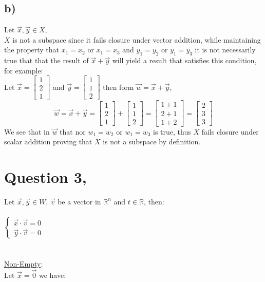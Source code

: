 \documentclass{article}
\begin{document}
\subsection*{b)}
Let $\vec{x},\vec{y}\in X$, \\
$X$ is not a subspace since it fails closure under vector addition, while maintaining the property that $x_1=x_2$ or $x_1=x_3$ and $y_1=y_2$ or $y_1=y_3$ it is not necessarily true that that the result of $\vec{x}+\vec{y}$ will yield a result that satisfies this condition, for example:\\
Let $\vec{x}=\begin{bmatrix}
    1\\2\\1
\end{bmatrix}$ and $\vec{y}=\begin{bmatrix}
    1\\1\\2
\end{bmatrix}$ then form $\vec{w}=\vec{x}+\vec{y}$,$$
\vec{w}=\vec{x}+\vec{y}=\begin{bmatrix}
    1\\2\\1
\end{bmatrix}
+
\begin{bmatrix}
    1\\1\\2
\end{bmatrix}
=
\begin{bmatrix}
    1+1\\
    2+1\\
    1+2
\end{bmatrix}=
\begin{bmatrix}
    2\\3\\3
\end{bmatrix}
$$
We see that in $\vec{w}$ that nor $w_1=w_2$ or $w_1=w_3$ is true, thus $X$ fails closure under scalar addition proving that $X$ is not a subspace by definition.
\newpage
\section*{Question 3, }
Let $\vec{x},\vec{y}\in W$, $\vec{v}$ be a vector in $\mathbb{R}^n$ and $t\in\mathbb{R}$, then:\\\\
$\begin{cases}
    \vec{x}\cdot\vec{v}=0\\
    \vec{y}\cdot\vec{v}=0
\end{cases}$ \\\\\\
\underline{Non-Empty}:\\
Let $\vec{x}=\vec{0}$ we have:\\
\end{document}
